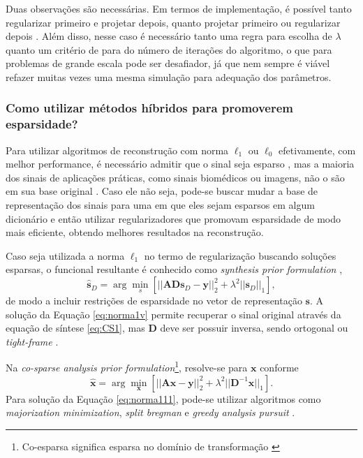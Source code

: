 Duas observações são necessárias.  Em termos de implementação, é possível tanto regularizar primeiro e projetar depois, quanto  projetar primeiro ou regularizar depois \cite[Figura 6.10]{hansen2010discrete}. Além disso, nesse caso é necessário tanto uma regra para escolha de  $\lambda$ quanto um critério de para do número de iterações do algoritmo, o que para problemas de grande escala pode ser desafiador, já que nem sempre é viável refazer muitas vezes uma mesma simulação para adequação dos parâmetros.  

\subsubsection{Como utilizar métodos híbridos para promoverem esparsidade?}
Para utilizar algoritmos de reconstrução com norma $\ell_1$ ou $\ell_0$ efetivamente, com melhor performance, é necessário admitir que o sinal seja esparso \cite{Daubechies2016}, mas a maioria dos sinais de aplicações práticas, como sinais biomédicos ou imagens, não o são em sua base original \cite[pág. 57]{majumdar2019compressed}. Caso ele não seja, pode-se buscar mudar a base de representação dos sinais para uma em que eles sejam esparsos em algum dicionário e então utilizar regularizadores que promovam esparsidade de modo mais eficiente, obtendo melhores resultados na reconstrução. 

Caso seja utilizada a norma $\ell_1$ no termo de regularização buscando soluções esparsas, o funcional resultante é conhecido como \textit{synthesis prior formulation} \cite[pág. 57]{majumdar2019compressed},
\begin{equation}
\mathbf{\hat{s}}_D = \arg\min\limits_{s} \left[ \vert \vert \mathbf{A} \mathbf{D} \mathbf{s}_D - \mathbf{y} \vert \vert^2_2 + \lambda^2 \vert \vert \mathbf{s}_D \vert \vert_1 \right],
\label{eq:norma1v}
\end{equation}
de modo a incluir restrições de esparsidade no vetor de representação $\mathbf{s}$. A solução da Equação \eqref{eq:norma1v} permite recuperar o sinal original através da equação de síntese \eqref{eq:CS1}, mas $\mathbf{D}$ deve ser possuir inversa, sendo ortogonal ou \textit{tight-frame} \cite[pág. 58]{majumdar2019compressed}. 


Na \textit{co-sparse analysis prior formulation}\footnote{Co-esparsa significa esparsa no domínio de transformação \cite[pág. 58]{majumdar2019compressed}}, resolve-se para $\mathbf{x}$ conforme
\begin{equation}
\hat{\mathbf{x}} = \arg\min\limits_{\mathbf{x}} \left[ \vert \vert \mathbf{A} \mathbf{x} - \mathbf{y} \vert \vert^2_2 + \lambda^2 \vert \vert \mathbf{D}^{-1} \mathbf{x} \vert \vert_1 \right].
\label{eq:norma111}
\end{equation}
Para solução da Equação \eqref{eq:norma111}, pode-se utilizar algoritmos como \textit{majorization minimization}, \textit{split bregman} e \textit{greedy analysis pursuit} \cite[págs. 58, 60, 62]{majumdar2019compressed}. 



